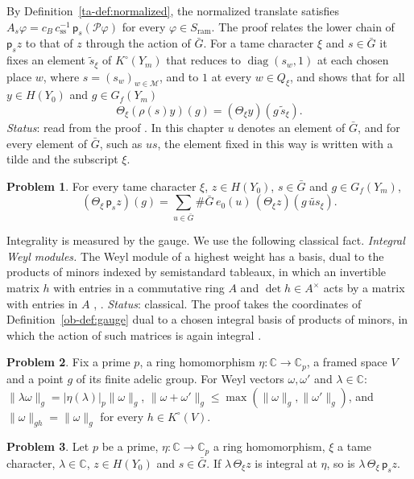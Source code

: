 \documentclass[reqno]{amsart}
\newcounter{chap}
\theoremstyle{definition}
\newtheorem{problem}{Problem}[section]
\theoremstyle{plain}
\theoremstyle{definition}
\newcommand{\C}{\mathbb{C}}
\newcommand{\Gb}{\bar G}
\newcommand{\Sram}{S_{\mathrm{ram}}}
\newcommand{\diag}{\operatorname{diag}}
\newcommand{\ps}{\mathsf p_s}
\begin{document}
By Definition~\ref{ta-def:normalized}, the normalized translate satisfies \(A_s\varphi = c_B\,c_{\mathrm{ss}}^{-1}\,\ps(\mathcal P\varphi)\) for every \(\varphi \in \Sram\).  The proof relates the lower chain of \(\ps z\) to that of \(z\) through the action of \(\Gb\).  For a tame character \(\xi\) and \(s \in \Gb\) it fixes an element \(\tilde s_\xi\) of \(K^\circ(Y_m)\) that reduces to \(\diag(s_w, 1)\) at each chosen place \(w\), where \(s = (s_w)_{w \in \mathcal M}\), and to \(1\) at every \(w \in Q_\xi\), and shows that for all \(y \in H(Y_0)\) and \(g \in G_f(Y_m)\)
\[
  \Theta_\xi(\rho(s)y)(g) = (\Theta_\xi y)(g\,\tilde s_\xi) .
\]
\emph{Status}: read from the proof \cite{GL}.  In this chapter \(u\) denotes an element of \(\Gb\), and for every element of \(\Gb\), such as \(us\), the element fixed in this way is written with a tilde and the subscript \(\xi\).

\begin{problem}\label{pr:expansion}
For every tame character \(\xi\), \(z \in H(Y_0)\), \(s \in \Gb\) and \(g \in G_f(Y_m)\),
\[
  (\Theta_\xi\,\ps z)(g) = \sum_{u \in \Gb} \#\Gb\,e_0(u)\,(\Theta_\xi z)(g\,\widetilde{us}_\xi) .
\]
\end{problem}

Integrality is measured by the gauge.  We use the following classical fact.  \emph{Integral Weyl modules.}  The Weyl module of a highest weight has a basis, dual to the products of minors indexed by semistandard tableaux, in which an invertible matrix \(h\) with entries in a commutative ring \(A\) and \(\det h \in A^\times\) acts by a matrix with entries in \(A\) \cite{DEP}, \cite{Fu}.  \emph{Status}: classical.  The proof takes the coordinates of Definition~\ref{ob-def:gauge} dual to a chosen integral basis of products of minors, in which the action of such matrices is again integral \cite{GL}.

\begin{problem}\label{pr:gauge}
Fix a prime \(p\), a ring homomorphism \(\eta\colon \C \to \C_p\), a framed space \(V\) and a point \(g\) of its finite adelic group.  For Weyl vectors \(\omega, \omega'\) and \(\lambda \in \C\): \(\lVert\lambda\omega\rVert_g = \lvert\eta(\lambda)\rvert_p\lVert\omega\rVert_g\), \(\lVert\omega + \omega'\rVert_g \le \max(\lVert\omega\rVert_g, \lVert\omega'\rVert_g)\), and \(\lVert\omega\rVert_{gh} = \lVert\omega\rVert_g\) for every \(h \in K^\circ(V)\).
\end{problem}

\begin{problem}\label{pr:good-integral}
Let \(p\) be a prime, \(\eta\colon\C\to\C_p\) a ring homomorphism, \(\xi\) a tame character, \(\lambda \in \C\), \(z \in H(Y_0)\) and \(s \in \Gb\).  If \(\lambda\,\Theta_\xi z\) is integral at \(\eta\), so is \(\lambda\,\Theta_\xi\,\ps z\).
\end{problem}
\end{document}
